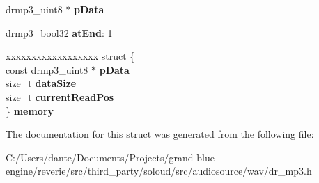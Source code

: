 \begin{DoxyCompactItemize}
\mbox{\label{structdrmp3_ab213ff0f962562a012673a75670a663c}} 
drmp3\+\_\+uint8 $\ast$ {\bfseries p\+Data}
\item 
\mbox{\label{structdrmp3_aec144001a290a012c3976112deeaa025}} 
drmp3\+\_\+bool32 {\bfseries at\+End}\+: 1
\item 
\mbox{\label{structdrmp3_a3fb1aebab62d64b78b728f1f43c58efa}} 
\begin{tabbing}
xx\=xx\=xx\=xx\=xx\=xx\=xx\=xx\=xx\=\kill
struct \{\\
\>const drmp3\_uint8 $\ast$ {\bfseries pData}\\
\>size\_t {\bfseries dataSize}\\
\>size\_t {\bfseries currentReadPos}\\
\} {\bfseries memory}\\

\end{tabbing}\end{DoxyCompactItemize}


The documentation for this struct was generated from the following file\+:\begin{DoxyCompactItemize}
\item 
C\+:/\+Users/dante/\+Documents/\+Projects/grand-\/blue-\/engine/reverie/src/third\+\_\+party/soloud/src/audiosource/wav/dr\+\_\+mp3.\+h\end{DoxyCompactItemize}
